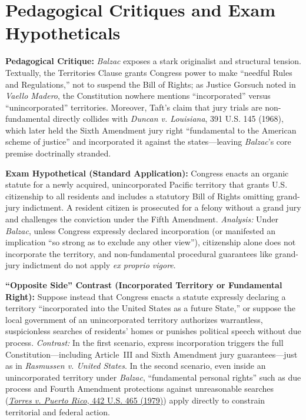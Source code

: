 \documentclass[12pt]{article}
\begin{document}
\section{Pedagogical Critiques and Exam Hypotheticals}
\textbf{Pedagogical Critique:} \textit{Balzac} exposes a stark originalist and structural tension. Textually, the Territories Clause grants Congress power to make ``needful Rules and Regulations,'' not to suspend the Bill of Rights; as Justice Gorsuch noted in \textit{Vaello Madero}, the Constitution nowhere mentions ``incorporated'' versus ``unincorporated'' territories. Moreover, Taft's claim that jury trials are non-fundamental directly collides with \textit{Duncan v. Louisiana}, 391 U.S. 145 (1968), which later held the Sixth Amendment jury right ``fundamental to the American scheme of justice'' and incorporated it against the states---leaving \textit{Balzac}'s core premise doctrinally stranded.

\textbf{Exam Hypothetical (Standard Application):} Congress enacts an organic statute for a newly acquired, unincorporated Pacific territory that grants U.S. citizenship to all residents and includes a statutory Bill of Rights omitting grand-jury indictment. A resident citizen is prosecuted for a felony without a grand jury and challenges the conviction under the Fifth Amendment. \textit{Analysis:} Under \textit{Balzac}, unless Congress expressly declared incorporation (or manifested an implication ``so strong as to exclude any other view''), citizenship alone does not incorporate the territory, and non-fundamental procedural guarantees like grand-jury indictment do not apply \textit{ex proprio vigore}.

\textbf{``Opposite Side'' Contrast (Incorporated Territory or Fundamental Right):} Suppose instead that Congress enacts a statute expressly declaring a territory ``incorporated into the United States as a future State,'' or suppose the local government of an unincorporated territory authorizes warrantless, suspicionless searches of residents' homes or punishes political speech without due process. \textit{Contrast:} In the first scenario, express incorporation triggers the full Constitution---including Article~III and Sixth Amendment jury guarantees---just as in \textit{Rasmussen v. United States}. In the second scenario, even inside an unincorporated territory under \textit{Balzac}, ``fundamental personal rights'' such as due process and Fourth Amendment protections against unreasonable searches (\href{https://supreme.justia.com/cases/federal/us/442/465/}{\textit{Torres v. Puerto Rico}, 442 U.S. 465 (1979)}) apply directly to constrain territorial and federal action.
\end{document}
